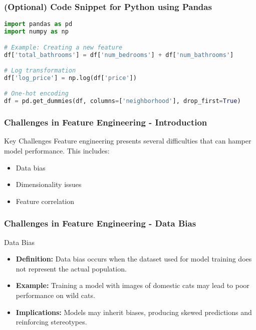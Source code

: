 \documentclass[aspectratio=169]{beamer}
\begin{document}
\begin{frame}[fragile]
    \frametitle{(Optional) Code Snippet for Python using Pandas}
    \begin{lstlisting}[language=Python]
import pandas as pd
import numpy as np

# Example: Creating a new feature
df['total_bathrooms'] = df['num_bedrooms'] + df['num_bathrooms']

# Log transformation
df['log_price'] = np.log(df['price'])

# One-hot encoding
df = pd.get_dummies(df, columns=['neighborhood'], drop_first=True)
    \end{lstlisting}
\end{frame}

\begin{frame}[fragile]
    \frametitle{Challenges in Feature Engineering - Introduction}
    \begin{block}{Key Challenges}
        Feature engineering presents several difficulties that can hamper model performance. 
        This includes:
        \begin{itemize}
            \item Data bias
            \item Dimensionality issues
            \item Feature correlation
        \end{itemize}
    \end{block}
\end{frame}

\begin{frame}[fragile]
    \frametitle{Challenges in Feature Engineering - Data Bias}
    \begin{block}{Data Bias}
        \begin{itemize}
            \item \textbf{Definition:} Data bias occurs when the dataset used for model training does not represent the actual population.
            \item \textbf{Example:} Training a model with images of domestic cats may lead to poor performance on wild cats.
            \item \textbf{Implications:} Models may inherit biases, producing skewed predictions and reinforcing stereotypes.
        \end{itemize}
    \end{block}
\end{frame}
\end{document}
